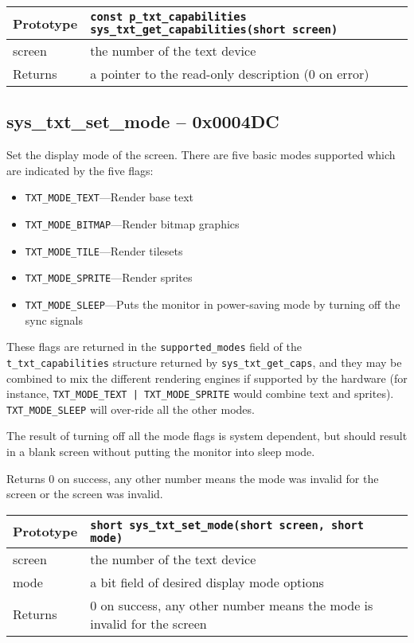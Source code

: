 \bigskip

\begin{tabular}{|l||l|} \hline
Prototype & \lstinline!const p_txt_capabilities sys_txt_get_capabilities(short screen)! \\ \hline
screen & the number of the text device \\ \hline
Returns & a pointer to the read-only description (0 on error) \\ \hline
\end{tabular}

\subsection*{sys\_txt\_set\_mode -- 0x0004DC}
Set the display mode of the screen. There are five basic modes supported which are indicated by the five flags:
\begin{itemize}
    \item \verb+TXT_MODE_TEXT+---Render base text
    \item \verb+TXT_MODE_BITMAP+---Render bitmap graphics
    \item \verb+TXT_MODE_TILE+---Render tilesets
    \item \verb+TXT_MODE_SPRITE+---Render sprites
    \item \verb+TXT_MODE_SLEEP+---Puts the monitor in power-saving mode by turning off the sync signals
\end{itemize}

These flags are returned in the \verb+supported_modes+ field of the \verb+t_txt_capabilities+ structure returned by \verb+sys_txt_get_caps+,
and they may be combined to mix the different rendering engines if supported by the hardware
(for instance, \verb+TXT_MODE_TEXT | TXT_MODE_SPRITE+ would combine text and sprites). \verb+TXT_MODE_SLEEP+ will over-ride all the other modes.

The result of turning off all the mode flags is system dependent, but should result in a blank screen without putting the monitor into sleep mode.

Returns 0 on success, any other number means the mode was invalid for the screen or the screen was invalid.

\bigskip

\begin{tabular}{|l||l|} \hline
Prototype & \lstinline!short sys_txt_set_mode(short screen, short mode)! \\ \hline
screen & the number of the text device \\ \hline
mode & a bit field of desired display mode options \\ \hline
Returns & 0 on success, any other number means the mode is invalid for the screen \\ \hline
\end{tabular}

